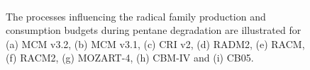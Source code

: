 \begin{figure}
    \begin{center}
        \includegraphics[width=\textwidth]{img/pentane_radical_budgets}
    \end{center}
    \caption{The processes influencing the radical family production and consumption budgets during pentane degradation are illustrated for (a) MCM v3.2, (b) MCM v3.1, (c) CRI v2, (d) RADM2, (e) RACM, (f) RACM2, (g) MOZART-4, (h) CBM-IV and (i) CB05.}
    \label{f:pentane_radical_budgets}
\end{figure}


